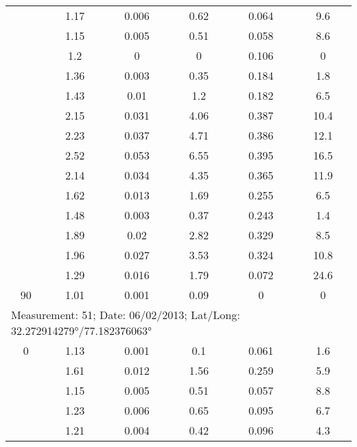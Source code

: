 \begin{longtable}{cccccc}
		& 1.17  & 0.006 & 0.62  & 0.064 & 9.6 \\
		
		& 1.15  & 0.005 & 0.51  & 0.058 & 8.6 \\
		
		& 1.2   & 0     & 0     & 0.106 & 0 \\
		
		& 1.36  & 0.003 & 0.35  & 0.184 & 1.8 \\
		
		& 1.43  & 0.01  & 1.2   & 0.182 & 6.5 \\
		
		& 2.15  & 0.031 & 4.06  & 0.387 & 10.4 \\
		
		& 2.23  & 0.037 & 4.71  & 0.386 & 12.1 \\
		
		& 2.52  & 0.053 & 6.55  & 0.395 & 16.5 \\
		
		& 2.14  & 0.034 & 4.35  & 0.365 & 11.9 \\
		
		& 1.62  & 0.013 & 1.69  & 0.255 & 6.5 \\
		
		& 1.48  & 0.003 & 0.37  & 0.243 & 1.4 \\
		
		& 1.89  & 0.02  & 2.82  & 0.329 & 8.5 \\
		
		& 1.96  & 0.027 & 3.53  & 0.324 & 10.8 \\
		
		& 1.29  & 0.016 & 1.79  & 0.072 & 24.6 \\
		
		90    & 1.01  & 0.001 & 0.09  & 0     & 0 \\ 
		\midrule
		\multicolumn{6}{l}{Measurement: 51; Date: 06/02/2013;
			Lat/Long: 32.272914279°/77.182376063°} \\		
		\midrule
		0     & 1.13  & 0.001 & 0.1   & 0.061 & 1.6 \\
		
		& 1.61  & 0.012 & 1.56  & 0.259 & 5.9 \\
		
		& 1.15  & 0.005 & 0.51  & 0.057 & 8.8 \\
		
		& 1.23  & 0.006 & 0.65  & 0.095 & 6.7 \\
		
		& 1.21  & 0.004 & 0.42  & 0.096 & 4.3 \\
		

\end{longtable}
